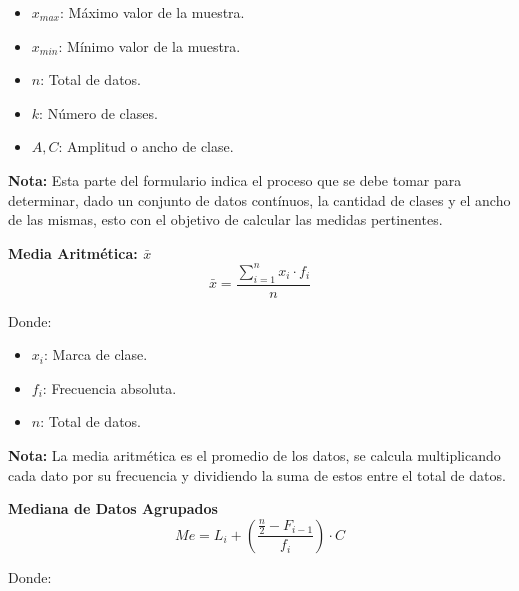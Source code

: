 \documentclass[11pt, a4paper]{article}
\newenvironment{construccionDeClases}{}{}
\newenvironment{mediaAritmetica}{}{}
\newenvironment{medianaDatosAgrupados}{}{}
\begin{document}
\begin{multicols}{2}
\begin{construccionDeClases}
\begin{itemize}
            \item $x_{max}$: Máximo valor de la muestra.
            \item $x_{min}$: Mínimo valor de la muestra.
            \item $n$: Total de datos.
            \item $k$: Número de clases.
            \item $A, C$: Amplitud o ancho de clase.
        \end{itemize}
        \textbf{Nota:}
        Esta parte del formulario indica el proceso que se debe tomar para determinar, dado un conjunto de datos contínuos, la cantidad de clases y el ancho de las mismas, esto con el objetivo de calcular las medidas pertinentes.
    \end{construccionDeClases}
    \begin{mediaAritmetica}
        \begin{center}
            \textbf{\large Media Aritmética: $\bar{x}$}
            \hrulefill
            \begin{equation*}
                \bar{x} = \frac{\sum\limits_{i=1}^{n} x_i \cdot f_i}{n}
                \end{equation*}
        \end{center}
        \vspace{-1cm}
        Donde:
        \begin{itemize}
            \item $x_i$: Marca de clase.
            \item $f_i$: Frecuencia absoluta.
            \item $n$: Total de datos.
        \end{itemize}
        \textbf{Nota:}
        La media aritmética es el promedio de los datos, se calcula multiplicando cada dato por su frecuencia y dividiendo la suma de estos entre el total de datos.
    \end{mediaAritmetica}
    \begin{medianaDatosAgrupados}
        \begin{center}
            \textbf{\large Mediana de Datos Agrupados}
            \hrulefill
            \begin{equation*}
                Me = L_i + \left( \frac{\frac{n}{2} - F_{i-1}}{f_i} \right) \cdot C
            \end{equation*}
        \end{center}
        \vspace{-1cm}
        Donde:
        \begin{itemize}

\end{itemize}
\end{medianaDatosAgrupados}
\end{multicols}
\end{document}
